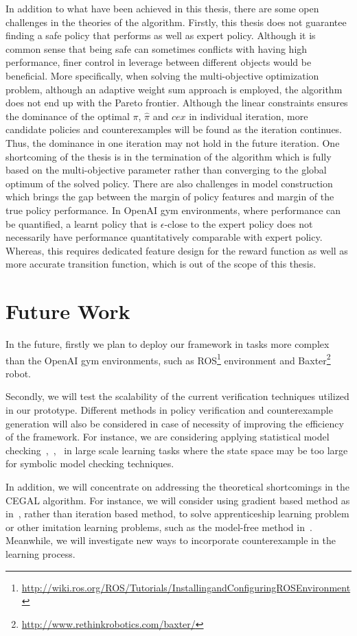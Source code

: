 In addition to what have been achieved in this thesis, there are some open challenges in the theories of the algorithm. Firstly, this thesis does not guarantee finding a safe policy that performs as well as expert policy. Although it is common sense that being safe can sometimes conflicts with having high performance, finer control in leverage between different objects would be beneficial. More specifically, when solving the multi-objective optimization problem, although an adaptive weight sum approach is employed, the algorithm does not end up with the Pareto frontier. Although the linear constraints ensures the dominance of the optimal $\pi$, $\hat{\pi}$ and $cex$ in individual iteration, more candidate policies and counterexamples will be found as the iteration continues. Thus, the dominance in one iteration may not hold in the future iteration. One shortcoming of the thesis is in the termination of the algorithm which is fully based on the multi-objective parameter rather than converging to the global optimum of the solved policy. There are also challenges in  model construction which brings the gap between the margin of policy features and margin of the true policy performance. In OpenAI gym environments, where performance can be quantified, a learnt policy that is {$\epsilon$-close} to the expert policy does not necessarily have performance quantitatively comparable with expert policy. Whereas, this requires dedicated feature design for the reward function as well as more accurate transition function, which is out of the scope of this thesis.

\section{Future Work}
In the future, firstly we plan to deploy our framework in tasks more complex than the OpenAI gym environments, such as ROS\footnote{\url{http://wiki.ros.org/ROS/Tutorials/InstallingandConfiguringROSEnvironment}} environment and Baxter\footnote{\url{http://www.rethinkrobotics.com/baxter/}} robot. 

Secondly, we will test the scalability of the current verification techniques utilized in our prototype. Different methods in policy verification and counterexample generation will also be considered in case of necessity of improving the efficiency of the framework. For instance, we are considering applying statistical model checking~\cite{10.1007/978-3-642-19829-8_10},~\cite{Younes:2006:SPM:1182767.1182770},~\cite{henriques2012statistical} in large scale learning tasks where the state space may be too large for symbolic model checking techniques.

In addition, we will concentrate on addressing the theoretical shortcomings in the CEGAL algorithm. For instance, we will consider using gradient based method as in~\cite{neu2012apprenticeship}, rather than iteration based method, to solve apprenticeship learning problem or other imitation learning problems, such as the model-free method in~\cite{ho2016model}. Meanwhile, we will investigate new ways to incorporate counterexample in the learning process.